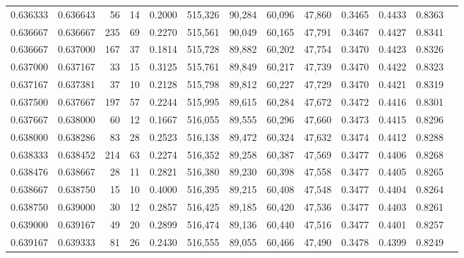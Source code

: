 \begin{tabular}{rrrrrrrrrrrrr}
0.636333 & 0.636643 &    56 &  14 &                                     0.2000 & 515,326 &  90,284 &  60,096 &  47,860 & 0.3465 & 0.4433 & 0.8363 \\
0.636667 & 0.636667 &   235 &  69 &                                     0.2270 & 515,561 &  90,049 &  60,165 &  47,791 & 0.3467 & 0.4427 & 0.8341 \\
0.636667 & 0.637000 &   167 &  37 &                                     0.1814 & 515,728 &  89,882 &  60,202 &  47,754 & 0.3470 & 0.4423 & 0.8326 \\
0.637000 & 0.637167 &    33 &  15 &                                     0.3125 & 515,761 &  89,849 &  60,217 &  47,739 & 0.3470 & 0.4422 & 0.8323 \\
0.637167 & 0.637381 &    37 &  10 &                                     0.2128 & 515,798 &  89,812 &  60,227 &  47,729 & 0.3470 & 0.4421 & 0.8319 \\
0.637500 & 0.637667 &   197 &  57 &                                     0.2244 & 515,995 &  89,615 &  60,284 &  47,672 & 0.3472 & 0.4416 & 0.8301 \\
0.637667 & 0.638000 &    60 &  12 &                                     0.1667 & 516,055 &  89,555 &  60,296 &  47,660 & 0.3473 & 0.4415 & 0.8296 \\
0.638000 & 0.638286 &    83 &  28 &                                     0.2523 & 516,138 &  89,472 &  60,324 &  47,632 & 0.3474 & 0.4412 & 0.8288 \\
0.638333 & 0.638452 &   214 &  63 &                                     0.2274 & 516,352 &  89,258 &  60,387 &  47,569 & 0.3477 & 0.4406 & 0.8268 \\
0.638476 & 0.638667 &    28 &  11 &                                     0.2821 & 516,380 &  89,230 &  60,398 &  47,558 & 0.3477 & 0.4405 & 0.8265 \\
0.638667 & 0.638750 &    15 &  10 &                                     0.4000 & 516,395 &  89,215 &  60,408 &  47,548 & 0.3477 & 0.4404 & 0.8264 \\
0.638750 & 0.639000 &    30 &  12 &                                     0.2857 & 516,425 &  89,185 &  60,420 &  47,536 & 0.3477 & 0.4403 & 0.8261 \\
0.639000 & 0.639167 &    49 &  20 &                                     0.2899 & 516,474 &  89,136 &  60,440 &  47,516 & 0.3477 & 0.4401 & 0.8257 \\
0.639167 & 0.639333 &    81 &  26 &                                     0.2430 & 516,555 &  89,055 &  60,466 &  47,490 & 0.3478 & 0.4399 & 0.8249 \\

\end{tabular}
